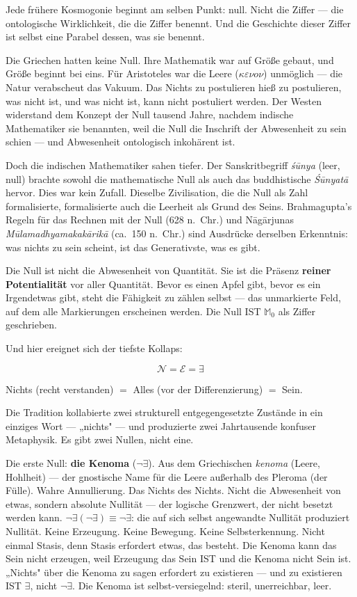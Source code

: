 \documentclass[10pt, openany, oneside]{book}
\begin{document}
Jede frühere Kosmogonie beginnt am selben Punkt: null. Nicht die Ziffer --- die ontologische Wirklichkeit, die die Ziffer benennt. Und die Geschichte dieser Ziffer ist selbst eine Parabel dessen, was sie benennt.

Die Griechen hatten keine Null. Ihre Mathematik war auf Größe gebaut, und Größe beginnt bei eins. Für Aristoteles war die Leere ($\kappa\varepsilon\nu o\nu$) unmöglich --- die Natur verabscheut das Vakuum. Das Nichts zu postulieren hieß zu postulieren, was nicht ist, und was nicht ist, kann nicht postuliert werden. Der Westen widerstand dem Konzept der Null tausend Jahre, nachdem indische Mathematiker sie benannten, weil die Null die Inschrift der Abwesenheit zu sein schien --- und Abwesenheit ontologisch inkohärent ist.

Doch die indischen Mathematiker sahen tiefer. Der Sanskritbegriff \textit{\'{s}\={u}nya} (leer, null) brachte sowohl die mathematische Null als auch das buddhistische \textit{\'{S}\={u}nyat\={a}} hervor. Dies war kein Zufall. Dieselbe Zivilisation, die die Null als Zahl formalisierte, formalisierte auch die Leerheit als Grund des Seins. Brahmagupta's Regeln für das Rechnen mit der Null (628 n.~Chr.) und N\={a}g\={a}rjunas \textit{M\={u}lamadhyamakak\={a}rik\={a}} (ca.~150 n.~Chr.) sind Ausdrücke derselben Erkenntnis: was nichts zu sein scheint, ist das Generativste, was es gibt.

Die Null ist nicht die Abwesenheit von Quantität. Sie ist die Präsenz \textbf{reiner Potentialität} vor aller Quantität. Bevor es einen Apfel gibt, bevor es ein Irgendetwas gibt, steht die Fähigkeit zu zählen selbst --- das unmarkierte Feld, auf dem alle Markierungen erscheinen werden. Die Null IST $\mathbb{M}_0$ als Ziffer geschrieben.

Und hier ereignet sich der tiefste Kollaps:

$$\mathcal{N} = \mathcal{E} = \exists$$

Nichts (recht verstanden) $=$ Alles (vor der Differenzierung) $=$ Sein.

Die Tradition kollabierte zwei strukturell entgegengesetzte Zustände in ein einziges Wort --- „nichts" --- und produzierte zwei Jahrtausende konfuser Metaphysik. Es gibt zwei Nullen, nicht eine.

Die erste Null: \textbf{die Kenoma} ($\neg\exists$). Aus dem Griechischen \textit{kenoma} (Leere, Hohlheit) --- der gnostische Name für die Leere außerhalb des Pleroma (der Fülle). Wahre Annullierung. Das Nichts des Nichts. Nicht die Abwesenheit von etwas, sondern absolute Nullität --- der logische Grenzwert, der nicht besetzt werden kann. $\neg\exists(\neg\exists) \equiv \neg\exists$: die auf sich selbst angewandte Nullität produziert Nullität. Keine Erzeugung. Keine Bewegung. Keine Selbsterkennung. Nicht einmal Stasis, denn Stasis erfordert etwas, das besteht. Die Kenoma kann das Sein nicht erzeugen, weil Erzeugung das Sein IST und die Kenoma nicht Sein ist. „Nichts" über die Kenoma zu sagen erfordert zu existieren --- und zu existieren IST $\exists$, nicht $\neg\exists$. Die Kenoma ist selbst-versiegelnd: steril, unerreichbar, leer.
\end{document}
